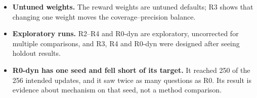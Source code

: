 \begin{itemize}
  \textbf{Environment loophole and parser.} The environment accepts
  answers without citations. This was kept deliberately for
  comparability, but it makes the R0 collapse possible. The citation
  separator also collides with `\&' in some titles
  (Section~\ref{sec:4.7}).
\item
  \textbf{Untuned weights.} The reward weights are untuned defaults; R3
  shows that changing one weight moves the coverage--precision balance.
\item
  \textbf{Exploratory runs.} R2--R4 and R0-dyn are exploratory,
  uncorrected for multiple comparisons, and R3, R4 and R0-dyn were
  designed after seeing holdout results.
\item
  \textbf{R0-dyn has one seed and fell short of its target.} It reached
  250 of the 256 intended updates, and it saw twice as many questions as
  R0. Its result is evidence about mechanism on that seed, not a method
  comparison.
\end{itemize}
